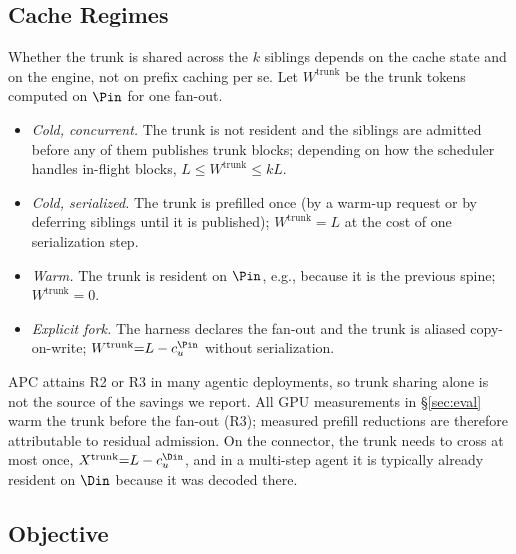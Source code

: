 \subsection{Cache Regimes}
\label{sec:regimes}

Whether the trunk is shared across the $k$ siblings depends on the cache state and on the engine, not on prefix caching per se.
Let $W^{\mathrm{trunk}}$ be the trunk tokens computed on $\Pin$ for one fan-out.
\begin{itemize}[leftmargin=*,itemsep=1pt,topsep=2pt]
\item[\textbf{R1}] \emph{Cold, concurrent.} The trunk is not resident and the siblings are admitted before any of them publishes trunk blocks; depending on how the scheduler handles in-flight blocks, $L\le W^{\mathrm{trunk}}\le kL$.
\item[\textbf{R2}] \emph{Cold, serialized.} The trunk is prefilled once (by a warm-up request or by deferring siblings until it is published); $W^{\mathrm{trunk}}{=}L$ at the cost of one serialization step.
\item[\textbf{R3}] \emph{Warm.} The trunk is resident on $\Pin$, e.g., because it is the previous spine; $W^{\mathrm{trunk}}{=}0$.
\item[\textbf{R4}] \emph{Explicit fork.} The harness declares the fan-out and the trunk is aliased copy-on-write; $W^{\mathrm{trunk}}{=}L-c_u^{\Pin}$ without serialization.
\end{itemize}
APC attains R2 or R3 in many agentic deployments, so trunk sharing alone is not the source of the savings we report.
All GPU measurements in \S\ref{sec:eval} warm the trunk before the fan-out (R3); measured prefill reductions are therefore attributable to residual admission.
On the connector, the trunk needs to cross at most once, $X^{\mathrm{trunk}}{=}L-c_u^{\Din}$, and in a multi-step agent it is typically already resident on $\Din$ because it was decoded there.

\subsection{Objective}
\label{sec:objective}


